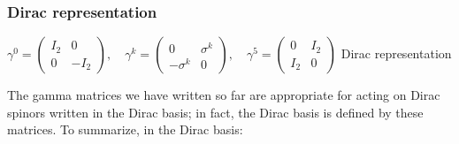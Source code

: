 \label{definition}
\begin{frame}\frametitle{Dirac representation}
$\gamma ^{0}={\begin{pmatrix}I_{2}&0\\0&-I_{2}\end{pmatrix}},\quad \gamma ^{k}={\begin{pmatrix}0&\sigma ^{k}\\-\sigma ^{k}&0\end{pmatrix}},\quad \gamma ^{5}={\begin{pmatrix}0&I_{2}\\I_{2}&0\end{pmatrix}}$
Dirac representation
 
The gamma matrices we have written so far are appropriate for acting on Dirac spinors written in the Dirac basis; in fact, the Dirac basis is defined by these matrices. To summarize, in the Dirac basis:


 
\end{frame}
